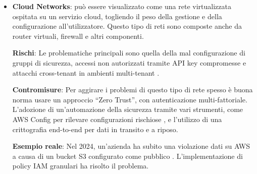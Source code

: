 \begin{itemize}
            \subitem \textbf{Rischi}: I rischi principali per questo tipo di rete sono: l'intercettazione del traffico su collegamenti pubblici, gli attacchi DDoS verso i router perimetrali o le configurazioni errate dei BGP.

            \subitem \textbf{Contromisure}: Le contromisure adottabili sono: la crittografia del traffico tra le reti, usando VPN IPsec o TLS, 
            implementazioni di protocolli sicuri come BGPSec o l'utilizzo di 
            firewall NGFW (Next-Generation Firewall) con filtraggio deep packet inspection \cite{NGFW_IPSec_VPN_WAN}.

             \subitem \textbf{Esempio Reale}: In questo articolo \cite{pwn2own} viene descritto come nella competizione Pwn2Own\footnote{Fonte: Wikipedia (\url{https://it.wikipedia.org/wiki/Pwn2Own})\\Competizione tra hacker con l'obiettivo di trovare delle falle in software e hardware di ultima generazione ritenuti o che erano stati dichiarati privi di vulnerabilità} una squadra ha trovato una vulnerabilità in un router TP-Link, connesso alla WAN che gli ha permesso di inserirsi nella LAN, attaccando successivamente una telecamera Synology.

            \newpage
            
            \item \textbf{Cloud Networks}: può essere visualizzato come una rete virtualizzata ospitata su un servizio cloud, togliendo il peso della gestione e della configurazione all'utilizzatore. Questo tipo di reti sono composte anche da router virtuali, firewall e altri componenti.

            \subitem \textbf{Rischi}: Le problematiche principali sono quella della mal configurazione di gruppi di sicurezza, accessi non autorizzati tramite API key compromesse e attacchi cross-tenant in ambienti multi-tenant \cite{multi_tenant_risks}.

            \subitem \textbf{Contromisure}: Per aggirare i problemi di questo tipo di rete spesso è buona norma usare un approccio “Zero Trust”, con autenticazione multi-fattoriale. L'adozione di un'automazione della sicurezza tramite vari strumenti, come AWS Config per rilevare configurazioni rischiose \cite{aws_config}, e l'utilizzo di una crittografia end-to-end  per dati in transito e a riposo.

            \subitem\textbf{Esempio reale}: Nel 2024, un’azienda ha subito una violazione dati su AWS a causa di un bucket S3 configurato come pubblico \cite{s3_bucket_attack}. L’implementazione di policy IAM granulari ha risolto il problema.
            
            \end{itemize}
            

